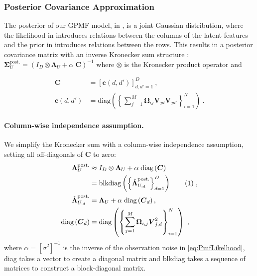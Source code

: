 \documentclass{article}
\theoremstyle{plain}
\theoremstyle{definition}
\theoremstyle{remark}
\newcommand\numberthis{\addtocounter{equation}{1}\tag{\theequation}}
\def\*#1{\boldsymbol{#1}}
\begin{document}
\subsubsection{Posterior Covariance Approximation} \label{sec:SparsePrecEstMStep:ApproxPostCov}

The posterior of our GPMF model, in , is a joint Gaussian distribution, where the likelihood in  introduces relations between the columns of the latent features and the prior in   introduces relations between the rows. This results in a posterior covariance matrix with an inverse Kronecker sum structure \cite{kalaitzis2013bigraphical,schacke2004kronecker}: $\*\Sigma_{U}^\text{post.} = (I_D \otimes \*\Lambda_U + \alpha \; \*C)^{-1}$ where $\otimes$ is the Kronecker product operator and 

\begin{align*}
\*C &= \left[ \*c(d,d') \right]_{d,d' = 1}^D \ , \\ \*c(d,d') &= \text{diag}\left( \left\{ \sum_{j=1}^{M}\*\Omega_{ij} \*V_{jd} \*V_{jd'} \right\}_{i=1}^N \right) \ .
\end{align*}



\paragraph{Column-wise independence assumption.} We simplify the Kronecker sum with a column-wise independence assumption, setting all off-diagonals of $\*C$ to zero:
\begin{align*}
\*\Lambda^\text{post.}_U  &\approx I_D \otimes \*\Lambda_U + \alpha \; \text{diag} \left( \*C \right)  \\ &= \text{blkdiag}\left( \left\{ \hat{\*\Lambda}_{U_{:d}}^{\text{post.}} \right\}_{d=1}^D \right)  \numberthis \label{eq:PostCovApprox} \;,
\\ 
\hat{\*\Lambda}_{U_{:d}}^{\text{post.}} &= \*\Lambda_U +\alpha \;  \text{diag} \left( \*C_d \right)
, \\
 \text{diag} \left( \*C_d \right) &=  \text{diag}\left( \left\{ \sum_{j=1}^{M}\*\Omega_{i,j} \*V_{j,d}^2 \right\}_{i=1}^N \right)  \ ,
\end{align*} 
where $\alpha = [\sigma^2]^{-1}$ is the inverse of the observation noise in \eqref{eq:PmfLikelhood}, diag takes a vector to create a diagonal matrix and blkdiag takes a sequence of matrices to construct a block-diagonal matrix.
\end{document}
